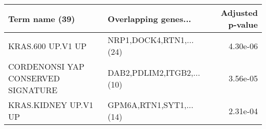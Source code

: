 \begin{tabular}{llr}
\toprule
                    Term name (39) &      Overlapping genes... &  Adjusted p-value \\
\midrule
                 KRAS.600 UP.V1 UP &   NRP1,DOCK4,RTN1,...(24) &          4.30e-06 \\
CORDENONSI YAP CONSERVED SIGNATURE & DAB2,PDLIM2,ITGB2,...(10) &          3.56e-05 \\
              KRAS.KIDNEY UP.V1 UP &   GPM6A,RTN1,SYT1,...(14) &          2.31e-04 \\
\bottomrule
\end{tabular}
